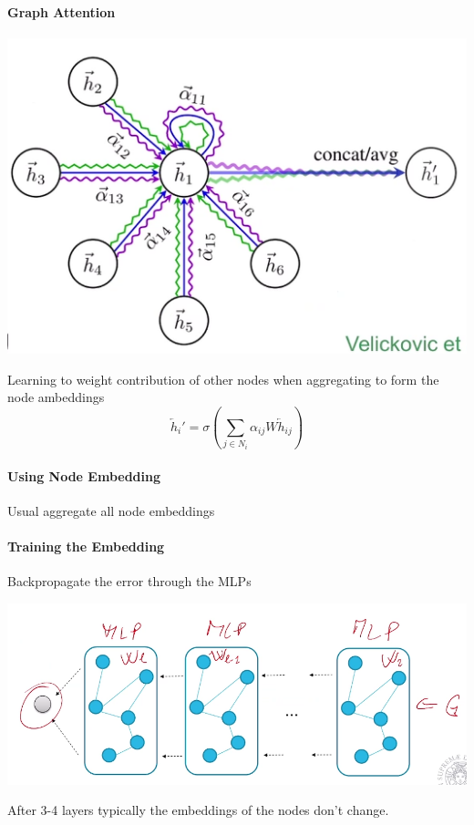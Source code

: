 \documentclass[10pt]{report}
\begin{document}
\paragraph{Graph Attention}
\begin{center}
	\includegraphics[scale=0.5]{200.png}
\end{center}
Learning to weight contribution of other nodes when aggregating to form the node ambeddings
$$\overleftarrow{h}_i' = \sigma\left(\sum_{j\in N_i} \alpha_{ij}W\overleftarrow{h}_{ij}\right)$$
\paragraph{Using Node Embedding} Usual aggregate all node embeddings %
\paragraph{Training the Embedding} Backpropagate the error through the MLPs %
\begin{center}
	\includegraphics[scale=0.5]{201.png}
\end{center}
After 3-4 layers typically the embeddings of the nodes don't change.
\end{document}
